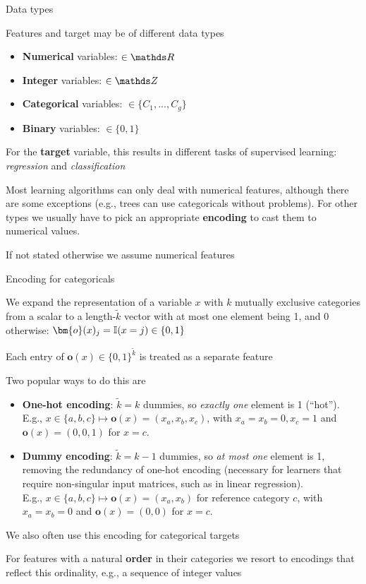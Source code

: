 \documentclass[11pt,compress,t,notes=noshow, xcolor=table]{beamer}
\begin{document}
\begin{framei}{Data types}
\item Features and target may be of different data types 
\begin{itemize}
\item \textbf{Numerical} variables: $\in \R$
\item \textbf{Integer} variables:  $\in \Z$
\item \textbf{Categorical} variables: $\in \{C_1,...,C_g\}$
\item \textbf{Binary} variables:   $\in \{0, 1\}$
\end{itemize}
\item For the \textbf{target} variable, this results in different tasks of supervised learning: \textit{regression} and \textit{classification}
\item Most learning algorithms can only deal with numerical features, although there are some exceptions (e.g., trees can use categoricals without problems).
For other types we usually have to pick an appropriate \textbf{encoding} to cast them to numerical values.
\item If not stated otherwise we assume numerical features
\end{framei}


\begin{framei}[fs=small]{Encoding for categoricals}
\item We expand the representation of a variable $x$ with $k$ mutually exclusive categories from a scalar to a length-$\tilde k$ vector with at most one element being 1, and 0 otherwise: $\bm{o}(x)_j =\I(x = j) \in \{0,1\}$
\item Each entry of $\bm{o}(x)\in \{0,1\}^{\tilde k}$ is treated as a separate feature
\item Two popular ways to do this are
\begin{itemize}\footnotesize
\item \textbf{One-hot encoding}: $\tilde k = k$ dummies, so \textit{exactly one} element is 1 (\enquote{hot}).
E.g., $x \in \{ a, b, c\} \mapsto \bm{o}(x) = (x_a, x_b, x_c)$, with $x_a = x_b = 0, x_c = 1$ and $\bm{o}(x) = (0, 0, 1)$ for $x = c$.
\item \textbf{Dummy encoding}: $\tilde k = k - 1$ dummies, so \textit{at most one} element is 1, removing the redundancy of one-hot encoding (necessary for learners that require non-singular input matrices, such as in linear regression). \\
E.g., $x \in \{ a, b, c\} \mapsto \bm{o}(x) = (x_a, x_b)$ for reference category $c$, with $x_a = x_b = 0$ and $\bm{o}(x) = (0, 0)$ for $x = c$.
\end{itemize}
\item We also often use this encoding for categorical targets
\item For features with a natural \textbf{order} in their categories we resort to encodings that reflect this ordinality, e.g., a sequence of integer values
\end{framei}
\end{document}
